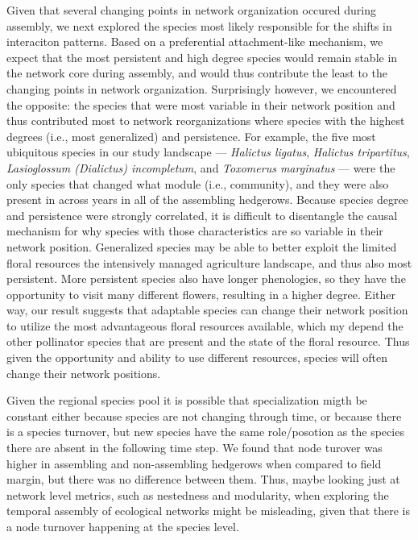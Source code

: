 \documentclass[12pt]{article}
\begin{document}
Given that several changing points in network organization occured
during assembly, we next explored the species most likely responsible
for the shifts in interaciton patterns. Based on a preferential
attachment-like mechanism, we expect that the most persistent and high
degree species would remain stable in the network core during
assembly, and would thus contribute the least to the changing points
in network organization. Surprisingly however, we encountered the
opposite: the species that were most variable in their network
position and thus contributed most to network reorganizations where
species with the highest degrees (i.e., most generalized) and
persistence. For example, the five most ubiquitous species in our
study landscape --- \textit{Halictus ligatus}, \textit{Halictus
  tripartitus}, \textit{Lasioglossum (Dialictus) incompletum}, and
\textit{Toxomerus marginatus} --- were the only species that changed
what module (i.e., community), and they were also present in across
years in all of the assembling hedgerows. Because species degree and
persistence were strongly correlated, it is difficult to disentangle
the causal mechanism for why species with those characteristics are so
variable in their network position. Generalized species may be able to
better exploit the limited floral resources the intensively managed
agriculture landscape, and thus also most persistent. More persistent
species also have longer phenologies, so they have the opportunity to
visit many different flowers, resulting in a higher degree. Either
way, our result suggests that adaptable species can change their
network position to utilize the most advantageous floral resources
available, which my depend the other pollinator species that are
present and the state of the floral resource. Thus given the
opportunity and ability to use different resources, species will often
change their network positions.

Given the regional species pool it is possible that specialization migth be constant either because species are not changing through time, or because there is a species turnover, but new species have the same role/posotion as the species there are absent in the following time step. We found that node turover was higher in assembling and non-assembling hedgerows when compared to field margin, but there was no difference between them. Thus, maybe looking just at network level metrics, such as nestedness and modularity, when exploring the temporal assembly of ecological networks might be misleading, given that there is a node turnover happening at the species level. 
\end{document}
